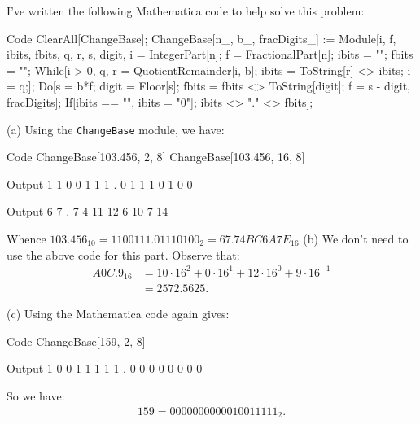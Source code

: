 \documentclass[12pt,twoside,openany]{memoir}
\begin{document}
\begin{solution}
    I've written the following Mathematica code to help solve this problem:
\begin{mmaCell}[functionlocal=y]{Code}
ClearAll[ChangeBase];
ChangeBase[n_, b_, fracDigits_] := 
    Module[{i, f, ibits, fbits, q, r, s, digit},
    i = IntegerPart[n];
    f = FractionalPart[n];
    ibits = "";
    fbits = "";
    While[i > 0, 
      {q, r} = QuotientRemainder[i, b];
      ibits = ToString[r] <> ibits;
      i = q;];
    Do[s = b*f;
      digit = Floor[s];
      fbits = fbits <> ToString[digit];
       f = s - digit, {fracDigits}];
    If[ibits == "", ibits = "0"];
    ibits <> "." <> fbits];
\end{mmaCell}

    (a) Using the \texttt{ChangeBase} module, we have:
\begin{mmaCell}[functionlocal = y]{Code}
ChangeBase[103.456, 2, 8]
ChangeBase[103.456, 16, 8]
\end{mmaCell}
\begin{mmaCell}{Output}
1 1 0 0 1 1 1 . 0 1 1 1 0 1 0 0
\end{mmaCell}
\begin{mmaCell}{Output}
6 7 . 7 4 11 12 6 10 7 14
\end{mmaCell}
    
Whence $103.456_{10} = 1100111.01110100_{2} = 67.74BC6A7E_{16}$ \nl
    \newpage
    (b) We don't need to use the above code for this part. Observe that:
        \begin{equation*}
        \begin{split}
            A0C.9_{16} 
            & = 10 \cdot 16^2 + 0 \cdot 16^1 + 12 \cdot 16^0 + 9 \cdot 16^{-1} \\
            & = 2572.5625.
        \end{split}
        \end{equation*}
        \vspace{20pt}

    (c) Using the Mathematica code again gives:
\begin{mmaCell}[functionlocal = y]{Code}
ChangeBase[159, 2, 8]
\end{mmaCell}
\begin{mmaCell}{Output}
1 0 0 1 1 1 1 1 . 0 0 0 0 0 0 0 0
\end{mmaCell}

    So we have:
        \begin{equation*}
        \begin{split}
            159 = 0000000000010011111_{2}.
        \end{split}
        \end{equation*}


\end{solution}
\end{document}

